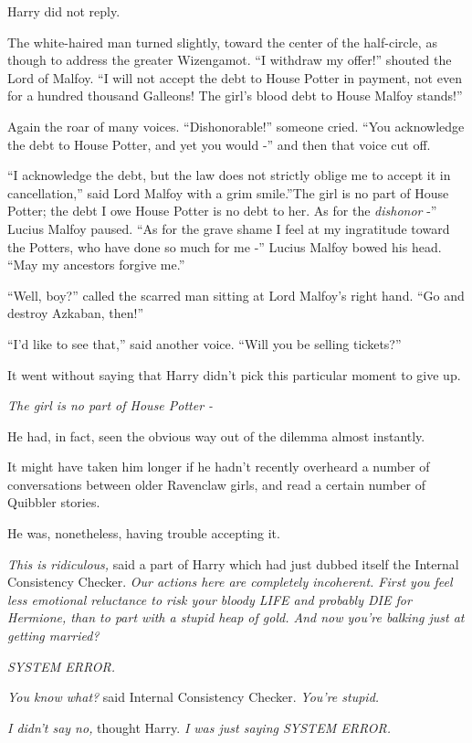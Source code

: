 Harry did not reply.

The white-haired man turned slightly, toward the center of the
half-circle, as though to address the greater Wizengamot. ``I withdraw
my offer!'' shouted the Lord of Malfoy. ``I will not accept the debt to
House Potter in payment, not even for a hundred thousand Galleons! The
girl's blood debt to House Malfoy stands!''

Again the roar of many voices. ``Dishonorable!'' someone cried. ``You
acknowledge the debt to House Potter, and yet you would -'' and then
that voice cut off.

``I acknowledge the debt, but the law does not strictly oblige me to
accept it in cancellation,'' said Lord Malfoy with a grim smile.''The
girl is no part of House Potter; the debt I owe House Potter is no debt
to her. As for the \emph{dishonor} -'' Lucius Malfoy paused. ``As for
the grave shame I feel at my ingratitude toward the Potters, who have
done so much for me -'' Lucius Malfoy bowed his head. ``May my ancestors
forgive me.''

``Well, boy?'' called the scarred man sitting at Lord Malfoy's right
hand. ``Go and destroy Azkaban, then!''

``I'd like to see that,'' said another voice. ``Will you be selling
tickets?''

It went without saying that Harry didn't pick this particular moment to
give up.

\emph{The girl is no part of House Potter -}

He had, in fact, seen the obvious way out of the dilemma almost
instantly.

It might have taken him longer if he hadn't recently overheard a number
of conversations between older Ravenclaw girls, and read a certain
number of Quibbler stories.

He was, nonetheless, having trouble accepting it.

\emph{This is ridiculous,} said a part of Harry which had just dubbed
itself the Internal Consistency Checker. \emph{Our actions here are
completely incoherent. First you feel less emotional reluctance to risk
your bloody LIFE and probably DIE for Hermione, than to part with a
stupid heap of gold. And now you're balking just at getting married?}

\emph{SYSTEM ERROR.}

\emph{You know what?} said Internal Consistency Checker. \emph{You're
stupid.}

\emph{I didn't say no,} thought Harry. \emph{I was just saying SYSTEM
ERROR.}

